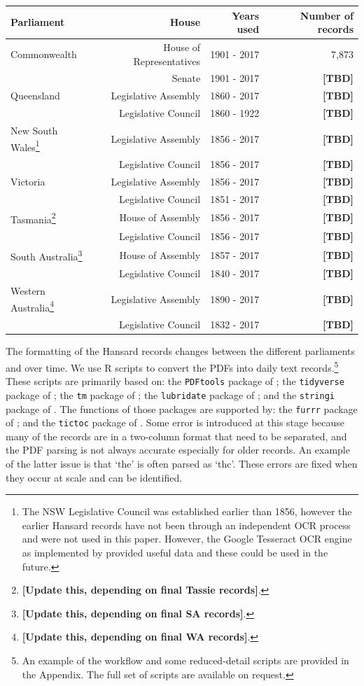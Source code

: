 \documentclass[12pt,]{article}
\begin{document}
\begin{longtable}[]{@{}lrrr@{}}
\toprule
Parliament & House & Years used & Number of records\tabularnewline
\midrule
\endhead
Commonwealth & House of Representatives & 1901 - 2017 &
7,873\tabularnewline
& Senate & 1901 - 2017 & \textbf{{[}TBD{]}}\tabularnewline
Queensland & Legislative Assembly & 1860 - 2017 &
\textbf{{[}TBD{]}}\tabularnewline
& Legislative Council & 1860 - 1922 & \textbf{{[}TBD{]}}\tabularnewline
New South Wales\footnote{The NSW Legislative Council was established
  earlier than 1856, however the earlier Hansard records have not been
  through an independent OCR process and were not used in this paper.
  However, the Google Tesseract OCR engine as implemented by
  \citet{Ooms2018tesseract} provided useful data and these could be used
  in the future.} & Legislative Assembly & 1856 - 2017 &
\textbf{{[}TBD{]}}\tabularnewline
& Legislative Council & 1856 - 2017 & \textbf{{[}TBD{]}}\tabularnewline
Victoria & Legislative Assembly & 1856 - 2017 &
\textbf{{[}TBD{]}}\tabularnewline
& Legislative Council & 1851 - 2017 & \textbf{{[}TBD{]}}\tabularnewline
Tasmania\footnote{\textbf{{[}Update this, depending on final Tassie
  records{]}}.} & House of Assembly & 1856 - 2017 &
\textbf{{[}TBD{]}}\tabularnewline
& Legislative Council & 1856 - 2017 & \textbf{{[}TBD{]}}\tabularnewline
South Australia\footnote{\textbf{{[}Update this, depending on final SA
  records{]}}.} & House of Assembly & 1857 - 2017 &
\textbf{{[}TBD{]}}\tabularnewline
& Legislative Council & 1840 - 2017 & \textbf{{[}TBD{]}}\tabularnewline
Western Australia\footnote{\textbf{{[}Update this, depending on final WA
  records{]}}.} & Legislative Assembly & 1890 - 2017 &
\textbf{{[}TBD{]}}\tabularnewline
& Legislative Council & 1832 - 2017 & \textbf{{[}TBD{]}}\tabularnewline
\bottomrule
\end{longtable}

The formatting of the Hansard records changes between the different
parliaments and over time. We use R scripts to convert the PDFs into
daily text records.\footnote{An example of the workflow and some
  reduced-detail scripts are provided in the Appendix. The full set of
  scripts are available on request.} These scripts are primarily based
on: the \texttt{PDFtools} package of \citet{Ooms2018pdftools}; the
\texttt{tidyverse} package of \citet{Wickham2017}; the \texttt{tm}
package of \citet{FeinererHornik2018}; the \texttt{lubridate} package of
\citet{GrolemundWickham2011}; and the \texttt{stringi} package of
\citet{Gagolewski2018}. The functions of those packages are supported
by: the \texttt{furrr} package of \citet{VaughanDancho2018}; and the
\texttt{tictoc} package of \citet{Izrailev2014}. Some error is
introduced at this stage because many of the records are in a two-column
format that need to be separated, and the PDF parsing is not always
accurate especially for older records. An example of the latter issue is
that `the' is often parsed as `thc'. These errors are fixed when they
occur at scale and can be identified.
\end{document}
